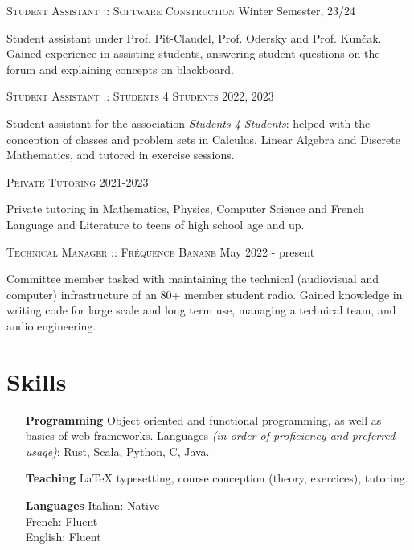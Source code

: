 \documentclass[10pt]{article}
\renewcommand{\line}[2]{{\vspace{4pt} \large \noindent\textsc{#1} \hfill #2}\vspace{4pt}}
\begin{document}
  \line{Student Assistant :: Software Construction}{Winter Semester, 23/24}

  Student assistant under Prof. Pit-Claudel, Prof. Odersky and Prof. Kunčak. Gained experience in assisting students, answering student questions on the forum and explaining concepts on blackboard.

  \line{Student Assistant :: Students 4 Students}{2022, 2023}

  Student assistant for the association \textit{Students 4 Students}: helped with the conception of classes and problem sets in Calculus, Linear Algebra and Discrete Mathematics, and tutored in exercise sessions.

  \line{Private Tutoring}{2021-2023}

  Private tutoring in Mathematics, Physics, Computer Science and French Language and Literature to teens of high school age and up.

  \line{Technical Manager :: Fréquence Banane}{May 2022 - present}

  Committee member tasked with maintaining the technical (audiovisual and computer) infrastructure of an 80+ member student radio. Gained knowledge in writing code for large scale and long term use, managing a technical team, and audio engineering.

  \section*{Skills}
  
  \begin{adjustwidth}{1in}{}
    \begin{itemize}
      \item[\textbf{Programming}] Object oriented and functional programming, as well as basics of web frameworks. Languages \textit{(in order of proficiency and preferred usage)}: Rust, Scala, Python, C, Java. 
      \item[\textbf{Teaching}] LaTeX typesetting, course conception (theory, exercices), tutoring.
      \item[\textbf{Languages}] Italian: Native \\ French: Fluent \\ English: Fluent
    \end{itemize}
  \end{adjustwidth}
\end{document}

